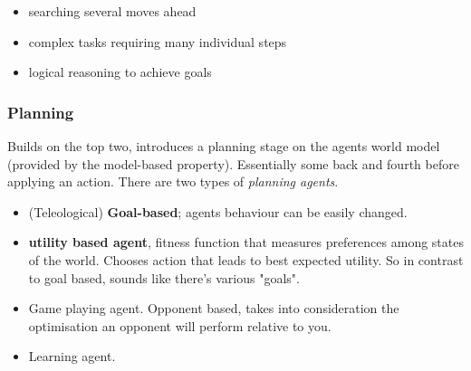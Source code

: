 \documentclass{article}
\begin{document}
\begin{itemize}
	\item searching several moves ahead
	\item complex tasks requiring many individual steps
	\item logical reasoning to achieve goals
\end{itemize}

\subsubsection{Planning}
Builds on the top two, introduces a planning stage on the agents world model (provided by the model-based property). Essentially some back and fourth before applying an action. There are two types of \emph{planning agents}.

\begin{itemize}
	\item (Teleological) \textbf{Goal-based}; agents behaviour can be easily changed.
	\item \textbf{utility based agent}, fitness function that measures preferences among states of the world. Chooses action that leads to best expected utility. So in contrast to goal based, sounds like there's various "goals".
	\item Game playing agent. Opponent based, takes into consideration the optimisation an opponent will perform relative to you.
	\item Learning agent.
\end{itemize}
\end{document}
